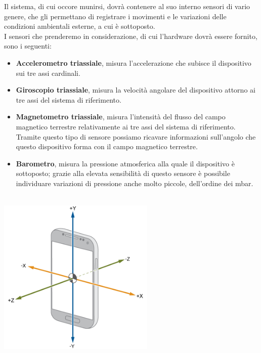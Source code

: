 \documentclass[a4paper, oneside]{book}
\begin{document}
Il sistema, di cui occore munirsi, dovrà contenere al suo interno sensori di vario genere, che gli permettano di registrare i movimenti e le variazioni delle condizioni ambientali esterne, a cui è sottoposto. \\
I sensori che prenderemo in considerazione, di cui l'hardware dovrà essere fornito, sono i seguenti:
\begin{itemize}
\item \textbf{Accelerometro triassiale}, misura l’accelerazione che subisce il dispositivo sui tre assi cardinali.
\item \textbf{Giroscopio triassiale}, misura la velocità angolare del dispositivo attorno ai tre assi del sistema di riferimento.
\item \textbf{Magnetometro triassiale}, misura l’intensità del flusso del campo magnetico terrestre relativamente ai tre assi del sistema di riferimento. Tramite questo tipo di sensore possiamo ricavare informazioni sull’angolo che questo dispositivo forma con il campo magnetico terrestre.
\item \textbf{Barometro}, misura la pressione atmosferica alla quale il dispositivo è sottoposto; grazie alla elevata sensibilità di questo sensore è possibile individuare variazioni di pressione anche molto piccole, dell’ordine dei mbar.\\ \\
\end{itemize}

\begin{center}
\begin{minipage}{0.68\linewidth}
\begin{center}
\includegraphics[width=75mm]{./images/triaxial_sensor.png}
\vspace{3mm}
\end{center}
\end{minipage}
\end{center}
\vspace{2mm}
\end{document}
